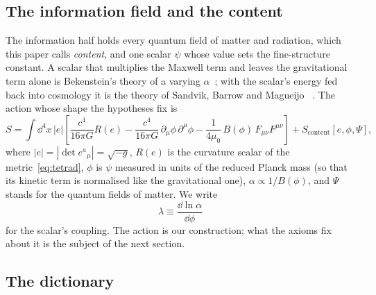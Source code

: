 \subsection{The information field and the content}

The information half holds every quantum field of matter and radiation, which this paper calls \emph{content}, and one scalar $\psi$ whose
value sets the fine-structure constant. A scalar that multiplies the Maxwell term and leaves the gravitational term alone is Bekenstein's
theory of a varying $\alpha$~\cite{bekenstein82}; with the scalar's energy fed back into cosmology it is the theory of Sandvik, Barrow
and Magueijo~\cite{bsbm} \tagP. The action whose shape the hypotheses fix is
\begin{equation}\label{eq:action}
S=\int\dd^4x\,|e|\left[\frac{c^4}{16\pi G}R(e)-\frac{c^4}{16\pi G}\,\partial_\mu\phi\,\partial^\mu\phi-\frac{1}{4\mu_0}\,B(\phi)\,
F_{\mu\nu}F^{\mu\nu}\right]+S_{\text{content}}[e,\phi,\Psi],
\end{equation}
where $|e|=|\det e^a{}_\mu|=\sqrt{-g}$, $R(e)$ is the curvature scalar of the metric~\eqref{eq:tetrad}, $\phi$ is $\psi$ measured in units of
the reduced Planck mass (so that its kinetic term is normalised like the gravitational one), $\alpha\propto1/B(\phi)$, and $\Psi$ stands for
the quantum fields of matter. We write
\begin{equation}\label{eq:lambda}
\lambda\equiv\frac{\dd\ln\alpha}{\dd\phi}
\end{equation}
for the scalar's coupling. The action is our construction; what the axioms fix about it is the subject of the next section.

\subsection{The dictionary}

